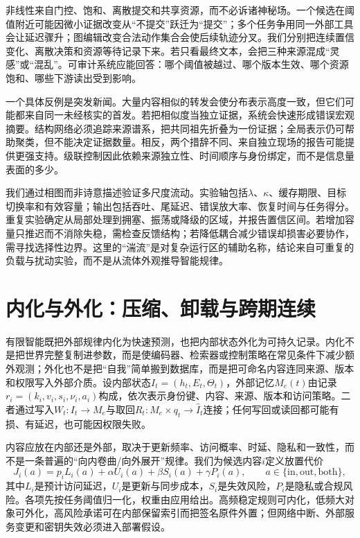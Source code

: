 非线性来自门控、饱和、离散提交和共享资源，而不必诉诸神秘场。一个候选在阈值附近可能因微小证据改变从“不提交”跃迁为“提交”；多个任务争用同一外部工具会让延迟骤升；图编辑改变合法动作集合会使后续轨迹分叉。我们分别把连续置信变化、离散决策和资源等待记录下来。若只看最终文本，会把三种来源混成“灵感”或“混乱”。可审计系统应能回答：哪个阈值被越过、哪个版本生效、哪个资源饱和、哪些下游读出受到影响。

一个具体反例是突发新闻。大量内容相似的转发会使分布表示高度一致，但它们可能都来自同一未经核实的首发。若把相似度当独立证据，系统会快速形成错误宏观摘要。结构网络必须追踪来源谱系，把共同祖先折叠为一份证据；全局表示仍可帮助聚类，但不能决定证据数量。相反，两个措辞不同、来自独立现场的报告可能提供更强支持。级联控制因此依赖来源独立性、时间顺序与身份绑定，而不是信息量表面的多少。

我们通过相图而非诗意描述验证多尺度流动。实验轴包括$\lambda$、$\kappa$、缓存期限、目标切换率和有效容量；输出包括吞吐、尾延迟、错误放大率、恢复时间与任务得分。重复实验确定从局部处理到拥塞、振荡或降级的区域，并报告置信区间。若增加容量只推迟而不消除失稳，需检查反馈结构；若降低耦合减少错误却损害必要协作，需寻找选择性边界。这里的“湍流”是对复杂运行区的辅助名称，结论来自可重复的负载与扰动实验，而不是从流体外观推导智能规律。

\section{内化与外化：压缩、卸载与跨期连续}
\label{sec:bidirectional_folding_hrf}

有限智能既把外部规律内化为快速预测，也把内部状态外化为可持久记录。内化不是把世界完整复制进参数，而是使编码器、检索器或控制策略在常见条件下减少额外观测；外化也不是把“自我”简单搬到数据库，而是把可命名内容连同来源、版本和权限写入外部介质。设内部状态$I_t=(h_t,E_t,\Theta_t)$，外部记忆$M_e(t)$由记录$r_i=(k_i,v_i,s_i,\nu_i,a_i)$构成，依次表示身份键、内容、来源、版本和访问策略。二者通过写入$W_t:I_t\to M_e$与取回$R_t:M_e\times q_t\to\widehat I_t$连接；任何写回或读回都可能有损、有延迟，也可能因权限失败。

内容应放在内部还是外部，取决于更新频率、访问概率、时延、隐私和一致性，而不是一条普遍的“向内卷曲/向外展开”规律。我们为候选内容$i$定义放置代价
\begin{equation}
 J_i(a)=p_iL_i(a)+\alpha U_i(a)+\beta S_i(a)+\gamma P_i(a),\qquad a\in\{\mathrm{in},\mathrm{out},\mathrm{both}\},
\end{equation}
其中$L_i$是预计访问延迟，$U_i$是更新与同步成本，$S_i$是失效风险，$P_i$是隐私或合规风险。各项先按任务阈值归一化，权重由应用给出。高频稳定规则可内化，低频大对象可外化，高风险承诺可在内部保留索引而把签名原件外置；但网络中断、外部服务变更和密钥失效必须进入部署假设。

